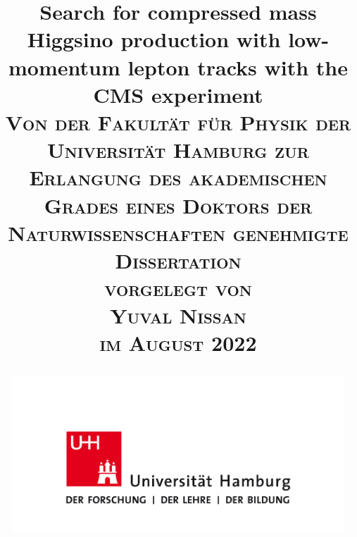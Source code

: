 \documentclass[12pt,a4paper]{book}
\begin{document}
\frontmatter

\thispagestyle{empty}

\title{
        \LARGE \textbf{Search for compressed mass Higgsino production with low-momentum
lepton tracks with the CMS experiment} \\[1.2cm]
        {\large\textsc{
		Von der Fakult\"at für Physik
		der Universit\"at Hamburg zur Erlangung des akademischen Grades eines
		Doktors der Naturwissenschaften genehmigte Dissertation
		\\[1.2cm]
		vorgelegt von
		\\[1.2cm]
		Yuval Nissan\\
		im August 2022
        }}
\vfill
\begin{center}
        \includegraphics[width=125mm]{uhh-logo.png}
\end{center}        
        
}
\author{}
\date{}
\maketitle


\thispagestyle{empty}


\thispagestyle{empty}
\null\vfill


\pagebreak

\tableofcontents

\mainmatter








%

\printglossaries

 
\listoffigures
\listoftables

\backmatter
\newpage{}
\end{document}
